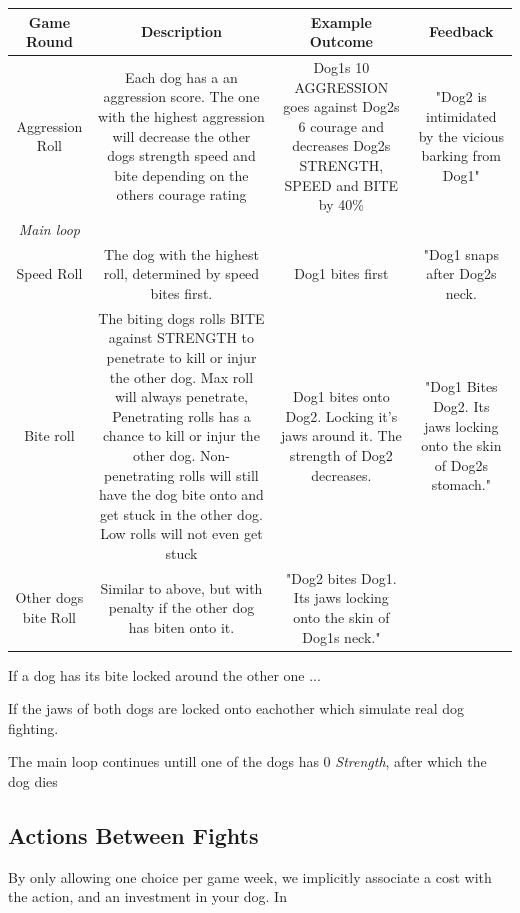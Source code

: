 	\begin{tabular}{|c|c|c|c|} 
		\hline
		Game Round & Description & Example Outcome & Feedback \\ [0.5ex] 
		\hline\hline
		Aggression Roll & Each dog has a an aggression score. The one with the highest aggression will decrease the other dogs strength speed and bite depending on the others courage rating & Dog1s 10 AGGRESSION goes against Dog2s 6 courage and decreases Dog2s STRENGTH, SPEED and BITE by 40\% & "Dog2 is intimidated by the vicious barking from Dog1" \\  
		\hline\hline
		\textit{Main loop} \\
		\hline
		Speed Roll	& The dog with the highest roll, determined by speed bites first. &	Dog1 bites first & "Dog1 snaps after Dog2s neck. \\
		\hline
		Bite roll & The biting dogs rolls BITE against STRENGTH to penetrate to kill or injur the other dog. Max roll will always penetrate, Penetrating rolls has a chance to kill or injur the other dog. Non-penetrating rolls will still have the dog bite onto and get stuck in the other dog. Low rolls will not even get stuck & Dog1 bites onto Dog2. Locking it's jaws around it. The strength of Dog2 decreases.	& "Dog1 Bites Dog2. Its jaws locking onto the skin of Dog2s stomach." \\
		\hline
		Other dogs bite Roll & Similar to above, but with penalty if the other dog has biten onto it. & "Dog2 bites Dog1. Its jaws locking onto the skin of Dog1s neck."
		\\
		\hline
	\end{tabular}


If a dog has its bite locked around the other one ...

If the jaws of both dogs are locked onto eachother
which simulate real dog fighting.

The main loop continues untill one of the dogs has 0 \textit{Strength}, after which the dog dies

\subsection{Actions Between Fights}
By only allowing one choice per game week, we implicitly associate a cost with the action, and an investment in your dog. In \cite{game:pokemon}

